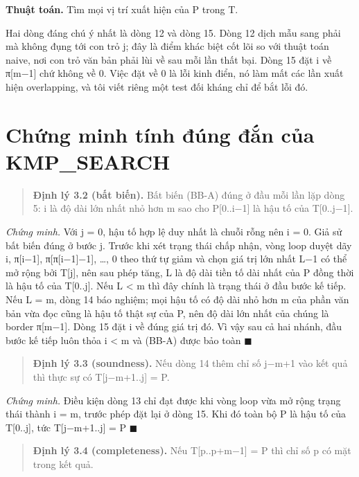 \begin{center}
\textbf{Thuật toán.} Tìm mọi vị trí xuất hiện của P trong T.
\end{center}

Hai dòng đáng chú ý nhất là dòng 12 và dòng 15. Dòng 12 dịch mẫu sang
phải mà không đụng tới con trỏ j; đây là điểm khác biệt cốt lõi so với
thuật toán naive, nơi con trỏ văn bản phải lùi về sau mỗi lần thất bại.
Dòng 15 đặt i về π{[}m−1{]} chứ không về 0. Việc đặt về 0 là lỗi kinh
điển, nó làm mất các lần xuất hiện overlapping, và tôi viết riêng một
test đối kháng chỉ để bắt lỗi đó.

\section{Chứng minh tính đúng đắn của KMP\_SEARCH}
\label{sec:3-3}

\begin{quote}
\textbf{Định lý 3.2 (bất biến).} Bất biến (BB-A) đúng ở đầu mỗi lần lặp
dòng 5: i là độ dài lớn nhất nhỏ hơn m sao cho P{[}0..i−1{]} là hậu tố
của T{[}0..j−1{]}.
\end{quote}

\emph{Chứng minh.} Với j = 0, hậu tố hợp lệ duy nhất là chuỗi rỗng nên i
= 0. Giả sử bất biến đúng ở bước j. Trước khi xét trạng thái chấp nhận,
vòng loop duyệt dãy i, π{[}i−1{]}, π{[}π{[}i−1{]}−1{]}, \ldots, 0 theo
thứ tự giảm và chọn giá trị lớn nhất L−1 có thể mở rộng bởi T{[}j{]},
nên sau phép tăng, L là độ dài tiền tố dài nhất của P đồng thời là hậu
tố của T{[}0..j{]}. Nếu L \textless{} m thì đây chính là trạng thái ở
đầu bước kế tiếp. Nếu L = m, dòng 14 báo nghiệm; mọi hậu tố có độ dài
nhỏ hơn m của phần văn bản vừa đọc cũng là hậu tố thật sự của P, nên độ
dài lớn nhất của chúng là border π{[}m−1{]}. Dòng 15 đặt i về đúng giá
trị đó. Vì vậy sau cả hai nhánh, đầu bước kế tiếp luôn thỏa i
\textless{} m và (BB-A) được bảo toàn \(\blacksquare\)

\begin{quote}
\textbf{Định lý 3.3 (soundness).} Nếu dòng 14 thêm chỉ số j−m+1 vào kết
quả thì thực sự có T{[}j−m+1..j{]} = P.
\end{quote}

\emph{Chứng minh.} Điều kiện dòng 13 chỉ đạt được khi vòng loop vừa mở
rộng trạng thái thành i = m, trước phép đặt lại ở dòng 15. Khi đó toàn
bộ P là hậu tố của T{[}0..j{]}, tức T{[}j−m+1..j{]} = P \(\blacksquare\)

\begin{quote}
\textbf{Định lý 3.4 (completeness).} Nếu T{[}p..p+m−1{]} = P thì chỉ số
p có mặt trong kết quả.
\end{quote}

